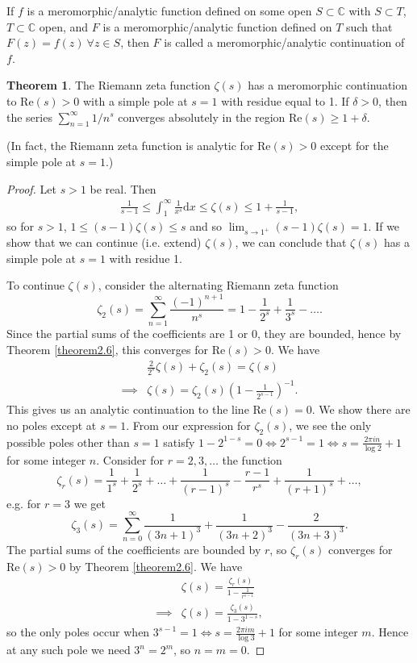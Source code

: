 \documentclass{article}
\theoremstyle{definition}
\newtheorem{theorem}{Theorem}[section]
\begin{document}
If $f$ is a meromorphic/analytic function defined on some open $S \subset \mathbb{C}$ with $S \subset T$, $T \subset \mathbb{C}$ open, and $F$ is a meromorphic/analytic function defined on $T$ such that $F(z)=f(z) ~\forall z \in S$, then $F$ is called a meromorphic/analytic continuation of $f$.
\begin{theorem}\label{theorem2.8}
    The Riemann zeta function $\zeta(s)$ has a meromorphic continuation to $\text{Re}(s)>0$ with a simple pole at $s=1$ with residue equal to 1. If $\delta>0$, then the series $\sum_{n=1}^{\infty} 1/n^s$ converges absolutely in the region $\text{Re}(s)\ge 1+\delta$.
\end{theorem}
(In fact, the Riemann zeta function is analytic for $\text{Re}(s)>0$ except for the simple pole at $s=1$.)
\begin{proof}
    Let $s>1$ be real. Then 
    \begin{align*}
        \frac{1}{s-1} \le \int_{1}^{\infty} \frac{1}{x^s} \mathrm{d}x \le \zeta(s) \le 1 + \frac{1}{s-1},
    \end{align*}
    so for $s>1$, $1\le (s-1)\zeta(s) \le s$ and so $\lim_{s \to 1^+} (s-1)\zeta(s)=1$. If we show that we can continue (i.e. extend) $\zeta(s)$, we can conclude that $\zeta(s)$ has a simple pole at $s=1$ with residue 1.
    \vspace{1mm}
     
    To continue $\zeta(s)$, consider the alternating Riemann zeta function \[
    \zeta_2(s) = \sum_{n=1}^{\infty} \frac{(-1)^{n+1}}{n^s} = 1 - \frac{1}{2^s} + \frac{1}{3^s} - \ldots.
    \]
    Since the partial sums of the coefficients are 1 or 0, they are bounded, hence by Theorem \ref{theorem2.6}, this converges for $\text{Re}(s)>0$. We have 
    \begin{align*}
        &\frac{2}{2^s}\zeta(s) + \zeta_2(s) = \zeta(s) \\
        \implies & \zeta(s) = \zeta_2(s) \left(1-\frac{1}{2^{s-1}}\right)^{-1}.
    \end{align*}
    This gives us an analytic continuation to the line $\text{Re}(s)=0$. We show there are no poles except at $s=1$. From our expression for $\zeta_2(s)$, we see the only possible poles other than $s=1$ satisfy $1-2^{1-s}=0 \iff 2^{s-1}=1 \iff s = \frac{2\pi i n}{\log 2}+1$ for some integer $n$. Consider for $r=2,3,\ldots$ the function \[
    \zeta_r(s) = \frac{1}{1^s} + \frac{1}{2^s} + \ldots + \frac{1}{(r-1)^s} - \frac{r-1}{r^s} + \frac{1}{(r+1)^s} + \ldots,
    \]
    e.g. for $r=3$ we get
    \[
    \zeta_3(s) = \sum_{n=0}^{\infty} \frac{1}{(3n+1)^3} + \frac{1}{(3n+2)^3} - \frac{2}{(3n+3)^3}. 
    \]
    The partial sums of the coefficients are bounded by $r$, so $\zeta_r(s)$ converges for $\text{Re}(s)>0$ by Theorem \ref{theorem2.6}. We have 
    \begin{align*}
        &\zeta(s) = \frac{\zeta_r(s)}{1-\frac{1}{r^{s-1}}} \\
        \implies & \zeta(s) = \frac{\zeta_3(s)}{1-3^{1-s}},
    \end{align*}
    so the only poles occur when $3^{s-1}=1 \iff s = \frac{2\pi i m}{\log 3}+1$ for some integer $m$. Hence at any such pole we need $3^n = 2^m$, so $n=m=0$.
\end{proof}
\end{document}
